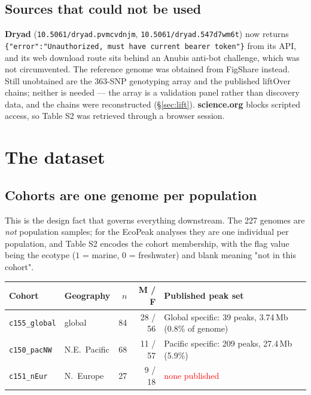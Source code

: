 \documentclass[11pt,a4paper]{article}
\begin{document}
\subsection{Sources that could not be used}

\textbf{Dryad} (\texttt{10.5061/dryad.pvmcvdnjm}, \texttt{10.5061/dryad.547d7wm6t}) now
returns \texttt{\{"error":"Unauthorized, must have current bearer token"\}} from its API,
and its web download route sits behind an Anubis anti-bot challenge, which was not
circumvented. The reference genome was obtained from FigShare instead. Still unobtained
are the 363-SNP genotyping array and the published liftOver chains; neither is needed ---
the array is a validation panel rather than discovery data, and the chains were
reconstructed (\S\ref{sec:lift}). \textbf{science.org} blocks scripted access, so Table S2
was retrieved through a browser session.

\section{The dataset}

\subsection{Cohorts are one genome per population}

This is the design fact that governs everything downstream. The 227 genomes are
\emph{not} population samples; for the EcoPeak analyses they are one individual per
population, and Table S2 encodes the cohort membership, with the flag value being the
ecotype ($1$ = marine, $0$ = freshwater) and blank meaning "not in this cohort".

\begin{table}[h]\centering\small
\begin{tabular}{llrrl}\toprule
Cohort & Geography & $n$ & M / F & Published peak set \\ \midrule
\texttt{c155\_global} & global & 84 & 28 / 56 & Global specific: 39 peaks, 3.74\,Mb (0.8\% of genome) \\
\texttt{c150\_pacNW}  & N.E.\ Pacific & 68 & 11 / 57 & Pacific specific: 209 peaks, 27.4\,Mb (5.9\%) \\
\texttt{c151\_nEur}   & N.\ Europe & 27 & 9 / 18 & \textcolor{red}{none published} \\ \bottomrule
\end{tabular}
\end{table}
\end{document}
